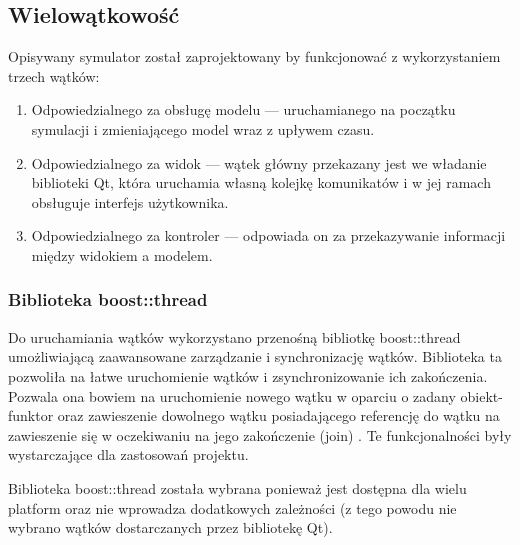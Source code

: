 {\subsection{Wielowątkowość}
\par{
Opisywany symulator został zaprojektowany by funkcjonować z wykorzystaniem trzech wątków:
\begin{enumerate}
\item Odpowiedzialnego za obsługę modelu --- uruchamianego na początku symulacji i zmieniającego model wraz z upływem czasu.
\item Odpowiedzialnego za widok --- wątek główny przekazany jest we władanie biblioteki Qt, która uruchamia własną kolejkę komunikatów i w jej ramach obsługuje interfejs użytkownika.
\item Odpowiedzialnego za kontroler --- odpowiada on za przekazywanie informacji między widokiem a modelem.
\end{enumerate}
}
\subsubsection{Biblioteka boost::thread}
\par{
Do uruchamiania wątków wykorzystano przenośną bibliotkę boost::thread \cite{Boost} umożliwiającą zaawansowane zarządzanie i synchronizację wątków. Biblioteka ta pozwoliła na łatwe uruchomienie wątków i zsynchronizowanie ich zakończenia. Pozwala ona bowiem na uruchomienie nowego wątku w oparciu o zadany obiekt-funktor \cite{Boost} oraz zawieszenie dowolnego wątku posiadającego referencję do wątku na zawieszenie się w oczekiwaniu na jego zakończenie (join) \cite{Boost}. Te funkcjonalności były wystarczające dla zastosowań projektu.
}
\par{
Biblioteka boost::thread została wybrana ponieważ jest dostępna dla wielu platform oraz nie wprowadza dodatkowych zależności (z tego powodu nie wybrano wątków dostarczanych przez bibliotekę Qt).
}

}
